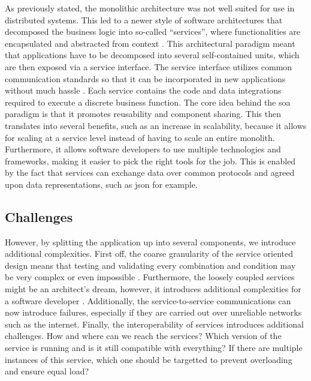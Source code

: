 
As previously stated, the \gls{monolith}ic architecture was not well suited for use in distributed systems. This led to a newer style of software architectures that decomposed the business logic into so-called “services”, where functionalities are encapsulated and abstracted from context \cite{perrey2003service}. This architectural paradigm meant that applications have to be decomposed into several self-contained units, which are then exposed via a service interface. The service interface utilizes common communication standards so that it can be incorporated in new applications without much hassle \cite{ibm-soa}. Each service contains the code and data integrations required to execute a discrete business function. The core idea behind the \gls{soa} paradigm is that it promotes reusability and component sharing. This then translates into several benefits, such as an increase in scalability, because it allows for scaling at a service level instead of having to scale an entire monolith. Furthermore, it allows software developers to use multiple technologies and frameworks, making it easier to pick the right tools for the job. This is enabled by the fact that services can exchange data over common protocols and agreed upon data representations, such as \gls{json} for example.



\subsection{Challenges}
However, by splitting the application up into several components, we introduce additional complexities. First off, the coarse granularity of the service oriented design means that testing and validating every combination and condition may be very complex or even impossible \cite{mahmood2007service}. Furthermore, the loosely coupled services might be an architect's dream, however, it introduces additional complexities for a software developer \cite{fowler2012patterns}.  Additionally, the service-to-service communications can now introduce failures, especially if they are carried out over unreliable networks such as the internet. Finally, the interoperability of services introduces additional challenges. How and where can we reach the services? Which version of the service is running and is it still compatible with everything? If there are multiple instances of this service, which one should be targetted to prevent overloading and ensure equal load? 

